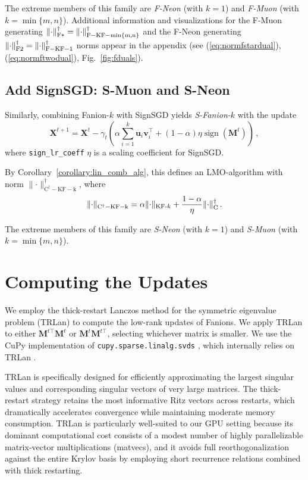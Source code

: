 \documentclass[smallextended,referee,envcountsect]{svjour3}
\def\vu{{\bm{u}}}
\def\vv{{\bm{v}}}
\def\mM{{\bm{M}}}
\def\mX{{\bm{X}}}
\DeclareMathOperator{\sign}{sign}
\newcommand{\norm}[1]{\lVert #1\rVert}
\DeclarePairedDelimiter{\normc}{\|}{\|_{\mathrm{C}}}
\DeclarePairedDelimiter{\normkfk}{\|}{\|_{\text{KF-}k}}
\DeclarePairedDelimiter{\normfstar}{\|}{\|_\mathrm{F*}}
\DeclarePairedDelimiter{\normftwo}{\|}{\|_\mathrm{F2}}
\newcommand{\figureref}[1]{Fig.~\ref{#1}}
\newcommand{\corollaryref}[1]{Corollary~\ref{#1}}
\begin{document}
 The extreme members of this family are \emph{F-Neon} (with $k = 1$) and \emph{F-Muon} (with $k = \min\{m, n\}$). Additional information and visualizations for the F-Muon generating $\normfstar{\cdot}^\dagger = \norm{\cdot}_{\mathrm{F-KF-\min\{m, n\}}}^\dagger$ and the F-Neon generating $\normftwo{\cdot}^\dagger = \norm{\cdot}_{\mathrm{F-KF-1}}^\dagger$ norms appear in the appendix (see (\ref{eq:normfstardual}), (\ref{eq:normftwodual}), \figureref{fig:fduals}).
 
 \subsection{Add SignSGD: S-Muon and S-Neon}
 
 Similarly, combining Fanion-$k$ with SignSGD yields \emph{S-Fanion-$k$} with the update
 \begin{equation}\label{eq:sign_muon_update}
     \mX^{t+1} = \mX^{t} - \gamma_t \left(\alpha \sum_{i = 1}^k \vu_i \vv_i^\top + (1-\alpha)\eta\sign(\mM^t)\right)\,,
 \end{equation}
 where \texttt{sign\_lr\_coeff} $\eta$ is a scaling coefficient for SignSGD.
 
 By \corollaryref{corollary:lin_comb_alg}, this defines an LMO-algorithm with norm $\norm{\cdot}_{\mathrm{C^\dagger-KF-k}}^\dagger$, where
 \begin{equation}\label{eq:ckfk_norm}
   \norm{\cdot}_{\mathrm{C^\dagger-KF-k}} = \alpha \normkfk{\cdot} + \frac{1-\alpha}{\eta}\normc{\cdot}^\dagger\,.
 \end{equation}
 
 The extreme members of this family are \emph{S-Neon} (with $k = 1$) and \emph{S-Muon} (with $k = \min\{m, n\}$).
 
 \section{Computing the Updates}\label{sec:matrix-side}
 We employ the thick-restart Lanczos method for the symmetric eigenvalue problem (TRLan) to compute the low-rank updates of Fanions. We apply TRLan to either $\mM^{t\top}\mM^t$ or $\mM^t \mM^{t\top}$, selecting whichever matrix is smaller. We use the CuPy implementation of \texttt{cupy.sparse.linalg.svds} \citep{cupy_svds_ref}, which internally relies on TRLan \citep{simonz1998thick}.
 
 TRLan is specifically designed for efficiently approximating the largest singular values and corresponding singular vectors of very large matrices. The thick-restart strategy retains the most informative Ritz vectors across restarts, which dramatically accelerates convergence while maintaining moderate memory consumption. TRLan is particularly well-suited to our GPU setting because its dominant computational cost consists of a modest number of highly parallelizable matrix-vector multiplications (matvecs), and it avoids full reorthogonalization against the entire Krylov basis by employing short recurrence relations combined with thick restarting.
 
\end{document}
